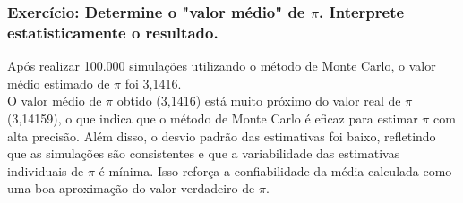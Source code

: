 \documentclass[12pt]{article}
\begin{document}
\subsubsection{Exercício: Determine o "valor médio" de \(\pi\). Interprete estatisticamente o resultado.}
Após realizar 100.000 simulações utilizando o método de Monte Carlo, o valor médio estimado de \(\pi\) foi 3,1416.\\
O valor médio de \(\pi\) obtido (3,1416) está muito próximo do valor real de \(\pi\) (3,14159), o que indica que o método de Monte Carlo é eficaz para estimar \(\pi\) com alta precisão. Além disso, o desvio padrão das estimativas foi baixo, refletindo que as simulações são consistentes e que a variabilidade das estimativas individuais de \(\pi\) é mínima. Isso reforça a confiabilidade da média calculada como uma boa aproximação do valor verdadeiro de \(\pi\).
\newpage
\end{document}
